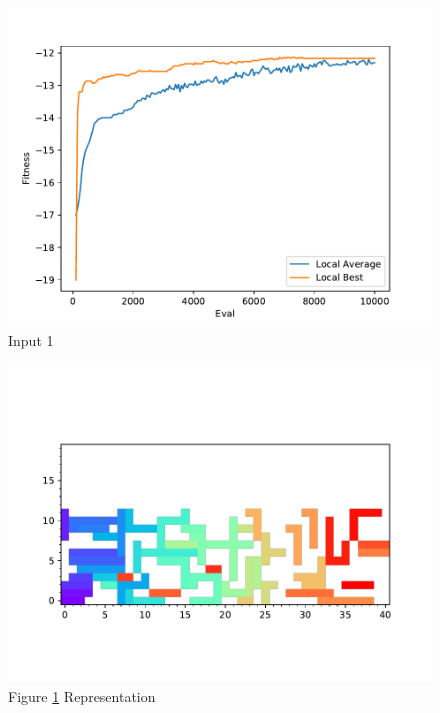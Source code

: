 \documentclass{standalone}
\begin{document}
\begin{figure}[!htb]
	\caption{Input 1}
	\label{fig:graph_1006}
	\includegraphics[width=\textwidth]{../graphs/graphs/1006.pdf}
\end{figure}


\begin{figure}[!htb]
	\caption{Figure \ref{fig:graph_1006} Representation}
	\label{fig:picture_1006}
	\includegraphics[width=\textwidth]{../graphs/picture/1006.pdf}
\end{figure}
\end{document}
